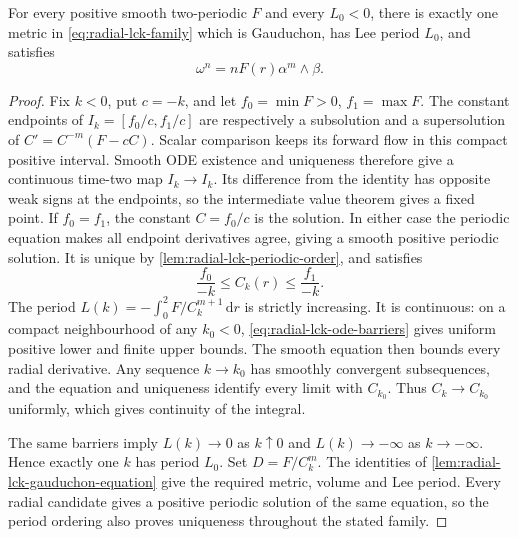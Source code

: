 \begin{theorem}\label{thm:radial-gauduchon-lck-volume}
For every positive smooth two-periodic $F$ and every $L_0<0$, there is exactly one metric in \eqref{eq:radial-lck-family} which is Gauduchon, has Lee period $L_0$, and satisfies
\[
 \omega^n=nF(r)\alpha^m\wedge\beta.
\]
\end{theorem}
\begin{proof}
Fix $k<0$, put $c=-k$, and let $f_0=\min F>0$, $f_1=\max F$. The constant endpoints of $I_k=[f_0/c,f_1/c]$ are respectively a subsolution and a supersolution of $C'=C^{-m}(F-cC)$. Scalar comparison keeps its forward flow in this compact positive interval. Smooth ODE existence and uniqueness therefore give a continuous time-two map $I_k\to I_k$. Its difference from the identity has opposite weak signs at the endpoints, so the intermediate value theorem gives a fixed point. If $f_0=f_1$, the constant $C=f_0/c$ is the solution. In either case the periodic equation makes all endpoint derivatives agree, giving a smooth positive periodic solution. It is unique by \cref{lem:radial-lck-periodic-order}, and satisfies
\begin{equation}\label{eq:radial-lck-ode-barriers}
 \frac{f_0}{-k}\leq C_k(r)\leq\frac{f_1}{-k}.
\end{equation}
The period $L(k)=-\int_0^2F/C_k^{m+1}\,\mathrm dr$ is strictly increasing. It is continuous: on a compact neighbourhood of any $k_0<0$, \eqref{eq:radial-lck-ode-barriers} gives uniform positive lower and finite upper bounds. The smooth equation then bounds every radial derivative. Any sequence $k\to k_0$ has smoothly convergent subsequences, and the equation and uniqueness identify every limit with $C_{k_0}$. Thus $C_k\to C_{k_0}$ uniformly, which gives continuity of the integral.

The same barriers imply $L(k)\to0$ as $k\uparrow0$ and $L(k)\to-\infty$ as $k\to-\infty$. Hence exactly one $k$ has period $L_0$. Set $D=F/C_k^m$. The identities of \cref{lem:radial-lck-gauduchon-equation} give the required metric, volume and Lee period. Every radial candidate gives a positive periodic solution of the same equation, so the period ordering also proves uniqueness throughout the stated family.
\end{proof}

